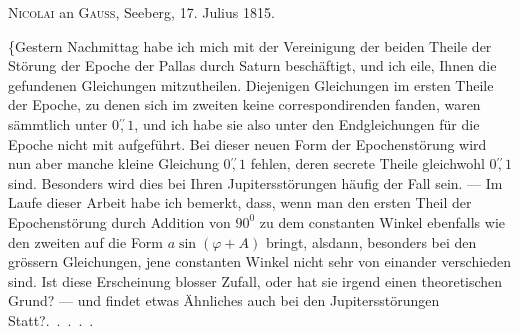 \par\medskip
{}
\begin{center}
\textsc{Nicolai} an \textsc{Gauss}, Seeberg, 17. Julius 1815.
\end{center}
\par\noindent\hspace*{\parindent}\{Gestern Nachmittag habe ich mich mit der Vereinigung der beiden
Theile der Störung der Epoche der Pallas durch Saturn beschäftigt, und ich
eile, Ihnen die gefundenen Gleichungen mitzutheilen. Diejenigen Gleichungen
im ersten Theile der Epoche, zu denen sich im zweiten keine correspondirenden
fanden, waren sämmtlich unter \(0\overset{\prime\prime}{,}1\), und ich habe sie also unter den
Endgleichungen für die Epoche nicht mit aufgeführt. Bei dieser neuen Form
der Epochenstörung wird nun aber manche kleine Gleichung  \(0\overset{\prime\prime}{,}1\) fehlen,
deren secrete Theile gleichwohl  \(0\overset{\prime\prime}{,}1\) sind. Besonders wird dies bei
Ihren Jupitersstörungen häufig der Fall sein. --- Im Laufe dieser Arbeit habe
ich bemerkt, dass, wenn man den ersten Theil der Epochenstörung durch
Addition von \(90^0\) zu dem constanten Winkel ebenfalls wie den zweiten auf
die Form \(a\sin(\varphi+A)\) bringt, alsdann, besonders bei den grössern Gleichungen,
jene constanten Winkel nicht sehr von einander verschieden sind. Ist diese
Erscheinung blosser Zufall, oder hat sie irgend einen theoretischen Grund?
--- und findet etwas Ähnliches auch bei den Jupitersstörungen Statt?\quad .\ .\ .\ .\ .

